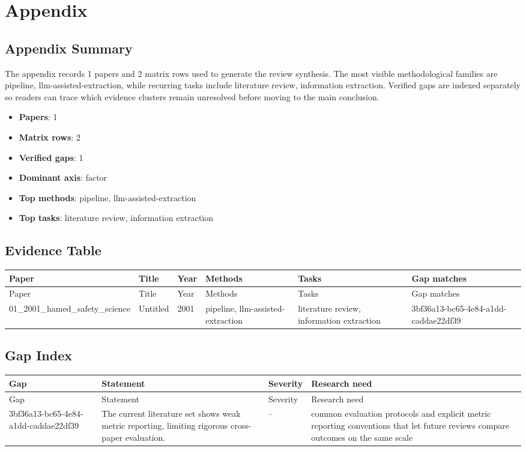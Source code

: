 \documentclass{article}
\begin{document}
\appendix
\section{Appendix}
\subsection{Appendix Summary}
\noindent The appendix records 1 papers and 2 matrix rows used to generate the review synthesis. The most visible methodological families are pipeline, llm-assisted-extraction, while recurring tasks include literature review, information extraction. Verified gaps are indexed separately so readers can trace which evidence clusters remain unresolved before moving to the main conclusion.

\begin{itemize}
\item \textbf{Papers}: 1
\item \textbf{Matrix rows}: 2
\item \textbf{Verified gaps}: 1
\item \textbf{Dominant axis}: factor
\item \textbf{Top methods}: pipeline, llm-assisted-extraction
\item \textbf{Top tasks}: literature review, information extraction
\end{itemize}

\subsection{Evidence Table}
\begin{longtable}{p{}p{}p{}p{}p{}p{}}
\toprule
Paper & Title & Year & Methods & Tasks & Gap matches \\
\midrule
\endfirsthead
\toprule
Paper & Title & Year & Methods & Tasks & Gap matches \\
\midrule
\endhead
01\_2001\_hamed\_safety\_science & Untitled & 2001 & pipeline, llm-assisted-extraction & literature review, information extraction & 3bf36a13-bc65-4e84-a1dd-caddae22df39 \\
\bottomrule
\end{longtable}

\subsection{Gap Index}
\begin{longtable}{p{}p{}p{}p{}}
\toprule
Gap & Statement & Severity & Research need \\
\midrule
\endfirsthead
\toprule
Gap & Statement & Severity & Research need \\
\midrule
\endhead
3bf36a13-bc65-4e84-a1dd-caddae22df39 & The current literature set shows weak metric reporting, limiting rigorous cross-paper evaluation. & -- & common evaluation protocols and explicit metric reporting conventions that let future reviews compare outcomes on the same scale \\
\bottomrule
\end{longtable}
\end{document}
